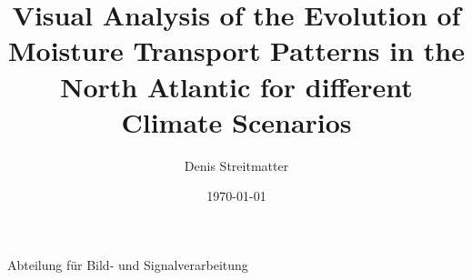 \title[Future Moisture Transport Patterns]{Visual Analysis of the Evolution of Moisture Transport Patterns in the North Atlantic for different Climate Scenarios}
\author{Denis Streitmatter}
\institute
{Abteilung für Bild- und Signalverarbeitung}
\date{\today}



